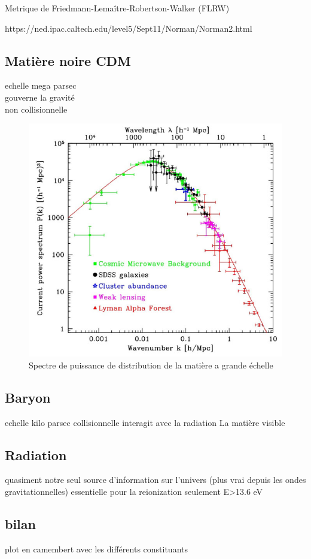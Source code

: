 Metrique de Friedmann-Lemaître-Robertson-Walker (FLRW)


https://ned.ipac.caltech.edu/level5/Sept11/Norman/Norman2.html

\subsection{Matière noire CDM}

echelle mega parsec\\
gouverne la gravité\\
non collisionnelle\\


\begin{figure}[bth]
        \includegraphics[width=.95\linewidth]{img/01/matter_power_spectrum.jpeg} 
        \caption{Spectre de puissance de distribution de la matière a grande échelle
        }
 		\label{fig:matter_power_spectrum}
\end{figure}



\subsection{Baryon}

echelle kilo parsec
collisionnelle
interagit avec la radiation
La matière visible

\subsection{Radiation}

quasiment notre seul source d'information sur l'univers (plus vrai depuis les ondes gravitationnelles)
essentielle pour la reionization
seulement E>13.6 eV

\subsection{bilan}

plot en camembert avec les différents constituants






